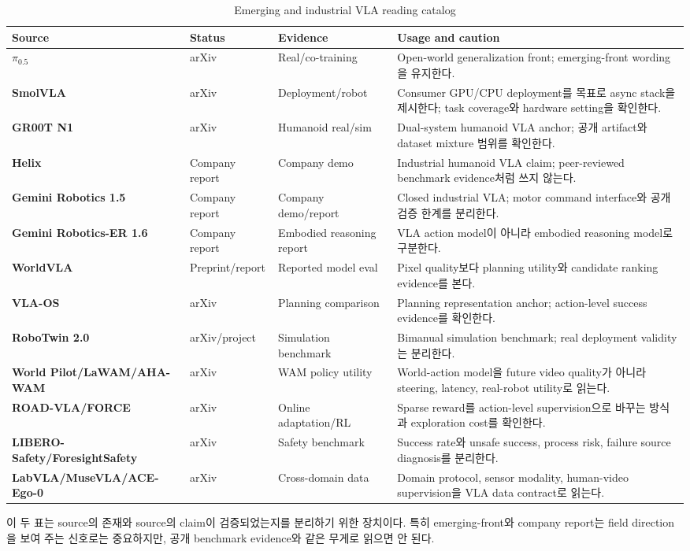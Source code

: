 \begin{table}[h]
  \centering
  \small
  \caption{Emerging and industrial VLA reading catalog}
  \label{tab:appendix_reading_catalog_emerging}
  \begin{tabularx}{\textwidth}{>{\bfseries}p{30mm}p{24mm}p{28mm}X}
    \toprule
    Source & Status & Evidence & Usage and caution \\
    \midrule
    \(\pi_{0.5}\) \citep{pi05} & arXiv & Real/co-training & Open-world generalization front; emerging-front wording을 유지한다. \\
    SmolVLA \citep{smolvla} & arXiv & Deployment/robot & Consumer GPU/CPU deployment를 목표로 async stack을 제시한다; task coverage와 hardware setting을 확인한다. \\
    GR00T N1 \citep{grootn1} & arXiv & Humanoid real/sim & Dual-system humanoid VLA anchor; 공개 artifact와 dataset mixture 범위를 확인한다. \\
    Helix \citep{helix} & Company report & Company demo & Industrial humanoid VLA claim; peer-reviewed benchmark evidence처럼 쓰지 않는다. \\
    Gemini Robotics 1.5 \citep{geminirobotics} & Company report & Company demo/report & Closed industrial VLA; motor command interface와 공개 검증 한계를 분리한다. \\
    Gemini Robotics-ER 1.6 \citep{geminiroboticser} & Company report & Embodied reasoning report & VLA action model이 아니라 embodied reasoning model로 구분한다. \\
    WorldVLA \citep{worldvla} & Preprint/report & Reported model eval & Pixel quality보다 planning utility와 candidate ranking evidence를 본다. \\
    VLA-OS \citep{vlaos} & arXiv & Planning comparison & Planning representation anchor; action-level success evidence를 확인한다. \\
    RoboTwin 2.0 \citep{robotwin2} & arXiv/project & Simulation benchmark & Bimanual simulation benchmark; real deployment validity는 분리한다. \\
    World Pilot/LaWAM/AHA-WAM \citep{worldpilot2026,lawam2026,ahawam2026} & arXiv & WAM policy utility & World-action model을 future video quality가 아니라 steering, latency, real-robot utility로 읽는다. \\
    ROAD-VLA/FORCE \citep{roadvla2026,forcevla2026} & arXiv & Online adaptation/RL & Sparse reward를 action-level supervision으로 바꾸는 방식과 exploration cost를 확인한다. \\
    LIBERO-Safety/ForesightSafety \citep{liberosafety2026,foresightsafety2026} & arXiv & Safety benchmark & Success rate와 unsafe success, process risk, failure source diagnosis를 분리한다. \\
    LabVLA/MuseVLA/ACE-Ego-0 \citep{labvla2026,musevla2026,aceego2026} & arXiv & Cross-domain data & Domain protocol, sensor modality, human-video supervision을 VLA data contract로 읽는다. \\
    \bottomrule
  \end{tabularx}
\end{table}

이 두 표는 source의 존재와 source의 claim이 검증되었는지를 분리하기 위한 장치이다. 특히 emerging-front와 company report는 field direction을 보여 주는 신호로는 중요하지만, 공개 benchmark evidence와 같은 무게로 읽으면 안 된다.
